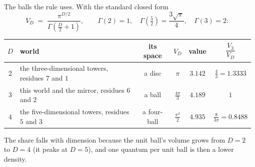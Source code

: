 \documentclass[11pt]{article}
\theoremstyle{definition}
\theoremstyle{plain}
\begin{document}
\label{c:note.dark-matter.setting-rule-2}
The balls the rule uses. With the standard closed form
\[
V_{D} \;=\; \frac{\pi^{D/2}}{\Gamma\!\left(\frac{D}{2} + 1\right)}, \qquad \Gamma(2) = 1, \quad \Gamma\!\left(\tfrac{5}{2}\right) = \frac{3\sqrt{\pi}}{4}, \quad \Gamma(3) = 2 :
\]
\begin{center} \begin{tabular}{clcccc}
\toprule
$D$ & world & its space & $V_{D}$ & value & $\dfrac{V_{3}}{V_{D}}$ \\[6pt]
\midrule
$2$ & the three-dimensional towers, residues $7$ and $1$ & a disc & $\pi$ & $3.142$ & $\tfrac{4}{3} = 1.3333$ \\[3pt]
$3$ & this world and the mirror, residues $6$ and $2$ & a ball & $\tfrac{4\pi}{3}$ & $4.189$ & $1$ \\[3pt]
$4$ & the five-dimensional towers, residues $5$ and $3$ & a four-ball & $\tfrac{\pi^{2}}{2}$ & $4.935$ & $\tfrac{8}{3\pi} = 0.8488$ \\[3pt]
\bottomrule
\end{tabular}
\end{center}
The share falls with dimension because the unit ball's volume grows from $D = 2$ to $D = 4$ (it peaks at $D = 5$), and one quantum per unit ball is then a lower density.
\end{document}
